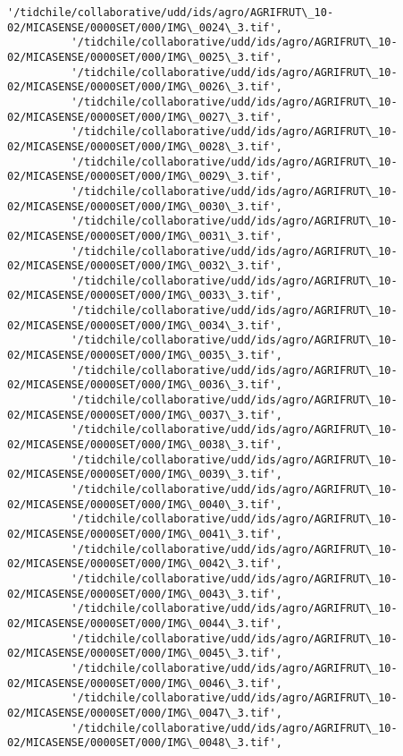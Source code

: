 \documentclass[11pt]{article}
\begin{document}
\begin{Verbatim}[commandchars=\\\{\}]
          '/tidchile/collaborative/udd/ids/agro/AGRIFRUT\_10-02/MICASENSE/0000SET/000/IMG\_0024\_3.tif',
          '/tidchile/collaborative/udd/ids/agro/AGRIFRUT\_10-02/MICASENSE/0000SET/000/IMG\_0025\_3.tif',
          '/tidchile/collaborative/udd/ids/agro/AGRIFRUT\_10-02/MICASENSE/0000SET/000/IMG\_0026\_3.tif',
          '/tidchile/collaborative/udd/ids/agro/AGRIFRUT\_10-02/MICASENSE/0000SET/000/IMG\_0027\_3.tif',
          '/tidchile/collaborative/udd/ids/agro/AGRIFRUT\_10-02/MICASENSE/0000SET/000/IMG\_0028\_3.tif',
          '/tidchile/collaborative/udd/ids/agro/AGRIFRUT\_10-02/MICASENSE/0000SET/000/IMG\_0029\_3.tif',
          '/tidchile/collaborative/udd/ids/agro/AGRIFRUT\_10-02/MICASENSE/0000SET/000/IMG\_0030\_3.tif',
          '/tidchile/collaborative/udd/ids/agro/AGRIFRUT\_10-02/MICASENSE/0000SET/000/IMG\_0031\_3.tif',
          '/tidchile/collaborative/udd/ids/agro/AGRIFRUT\_10-02/MICASENSE/0000SET/000/IMG\_0032\_3.tif',
          '/tidchile/collaborative/udd/ids/agro/AGRIFRUT\_10-02/MICASENSE/0000SET/000/IMG\_0033\_3.tif',
          '/tidchile/collaborative/udd/ids/agro/AGRIFRUT\_10-02/MICASENSE/0000SET/000/IMG\_0034\_3.tif',
          '/tidchile/collaborative/udd/ids/agro/AGRIFRUT\_10-02/MICASENSE/0000SET/000/IMG\_0035\_3.tif',
          '/tidchile/collaborative/udd/ids/agro/AGRIFRUT\_10-02/MICASENSE/0000SET/000/IMG\_0036\_3.tif',
          '/tidchile/collaborative/udd/ids/agro/AGRIFRUT\_10-02/MICASENSE/0000SET/000/IMG\_0037\_3.tif',
          '/tidchile/collaborative/udd/ids/agro/AGRIFRUT\_10-02/MICASENSE/0000SET/000/IMG\_0038\_3.tif',
          '/tidchile/collaborative/udd/ids/agro/AGRIFRUT\_10-02/MICASENSE/0000SET/000/IMG\_0039\_3.tif',
          '/tidchile/collaborative/udd/ids/agro/AGRIFRUT\_10-02/MICASENSE/0000SET/000/IMG\_0040\_3.tif',
          '/tidchile/collaborative/udd/ids/agro/AGRIFRUT\_10-02/MICASENSE/0000SET/000/IMG\_0041\_3.tif',
          '/tidchile/collaborative/udd/ids/agro/AGRIFRUT\_10-02/MICASENSE/0000SET/000/IMG\_0042\_3.tif',
          '/tidchile/collaborative/udd/ids/agro/AGRIFRUT\_10-02/MICASENSE/0000SET/000/IMG\_0043\_3.tif',
          '/tidchile/collaborative/udd/ids/agro/AGRIFRUT\_10-02/MICASENSE/0000SET/000/IMG\_0044\_3.tif',
          '/tidchile/collaborative/udd/ids/agro/AGRIFRUT\_10-02/MICASENSE/0000SET/000/IMG\_0045\_3.tif',
          '/tidchile/collaborative/udd/ids/agro/AGRIFRUT\_10-02/MICASENSE/0000SET/000/IMG\_0046\_3.tif',
          '/tidchile/collaborative/udd/ids/agro/AGRIFRUT\_10-02/MICASENSE/0000SET/000/IMG\_0047\_3.tif',
          '/tidchile/collaborative/udd/ids/agro/AGRIFRUT\_10-02/MICASENSE/0000SET/000/IMG\_0048\_3.tif',

\end{Verbatim}
\end{document}
